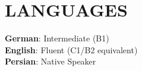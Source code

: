 \documentclass[A4,11pt]{article}
\begin{document}
\section{LANGUAGES}
 \begin{itemize}[leftmargin=0.15in, label={}]
    \small{\item{
     \textbf{German}{: Intermediate (B1)}  \\
     \textbf{English}{: Fluent (C1/B2 equivalent)  } \\
     \textbf{Persian}{: Native Speaker}
    }}
 \end{itemize}



\end{document}
